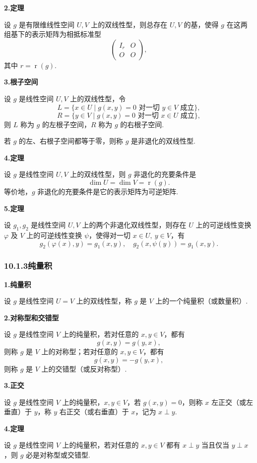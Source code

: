 \documentclass[UTF8, 12pt, fontset=fandol, oneside]{ctexart}
\begin{document}
\noindent\textbf{2.\quad 定理}

设 $g$ 是有限维线性空间 $U,V$ 上的双线性型，则总存在 $U,V$ 的基，使得 $g$ 在这两组基下的表示矩阵为相抵标准型
\[
\left(\begin{array}{cc}
I_r & O\\
O & O
\end{array}\right),
\]
其中 $r=\operatorname{r}(g)$.

\noindent\textbf{3.\quad 根子空间}

设 $g$ 是线性空间 $U,V$ 上的双线性型，令
\[
L=\{x\in U\mid g(x,y)=0\text{ 对一切 }y\in V\text{ 成立}\},
\]
\[
R=\{y\in V\mid g(x,y)=0\text{ 对一切 }x\in U\text{ 成立}\},
\]
则 $L$ 称为 $g$ 的左根子空间，$R$ 称为 $g$ 的右根子空间.

若 $g$ 的左、右根子空间都等于零，则称 $g$ 是非退化的双线性型.

\noindent\textbf{4.\quad 定理}

设 $g$ 是线性空间 $U,V$ 上的双线性型，则 $g$ 非退化的充要条件是
\[
\dim U=\dim V=\operatorname{r}(g).
\]
等价地，$g$ 非退化的充要条件是它的表示矩阵为可逆矩阵.

\noindent\textbf{5.\quad 定理}

设 $g_1,g_2$ 是线性空间 $U,V$ 上的两个非退化双线性型，则存在 $U$ 上的可逆线性变换 $\varphi$ 及 $V$ 上的可逆线性变换 $\psi$，使得对一切 $x\in U,\ y\in V$，有
\[
g_2(\varphi(x),y)=g_1(x,y),\quad g_2(x,\psi(y))=g_1(x,y).
\]

\subsubsection*{10.1.3\quad 纯量积}

\noindent\textbf{1.\quad 纯量积}

设 $g$ 是线性空间 $U=V$ 上的双线性型，称 $g$ 是 $V$ 上的一个纯量积（或数量积）.

\noindent\textbf{2.\quad 对称型和交错型}

设 $g$ 是线性空间 $V$ 上的纯量积，若对任意的 $x,y\in V$，都有
\[
g(x,y)=g(y,x),
\]
则称 $g$ 是 $V$ 上的对称型；若对任意的 $x,y\in V$，都有
\[
g(x,y)=-g(y,x),
\]
则称 $g$ 是 $V$ 上的交错型（或反对称型）.

\noindent\textbf{3.\quad 正交}

设 $g$ 是线性空间 $V$ 上的纯量积，$x,y\in V$，若 $g(x,y)=0$，则称 $x$ 左正交（或左垂直）于 $y$，称 $y$ 右正交（或右垂直）于 $x$，记为 $x\perp y$.

\noindent\textbf{4.\quad 定理}

设 $g$ 是线性空间 $V$ 上的纯量积，若对任意的 $x,y\in V$ 都有 $x\perp y$ 当且仅当 $y\perp x$，则 $g$ 必是对称型或交错型.
\end{document}
